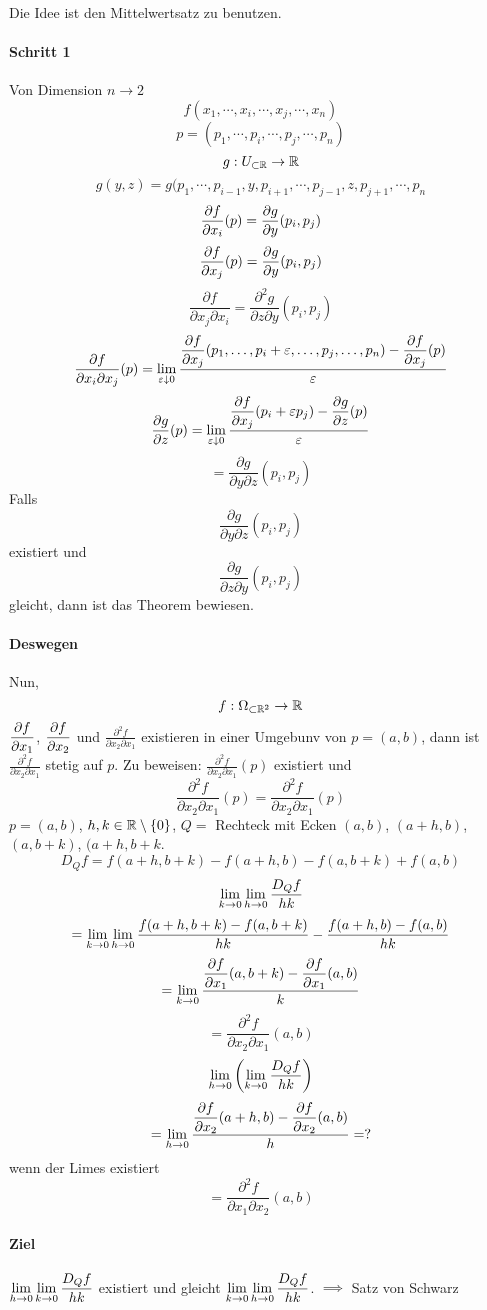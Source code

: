 \begin{Bew}
  Die Idee ist den Mittelwertsatz zu benutzen.
  \paragraph{Schritt 1} Von Dimension $n\to 2$
  \[f(x_1,\cdots,x_i,\cdots,x_j,\cdots,x_n)\]
  \[p=(p_1,\cdots,p_i,\cdots,p_j,\cdots,p_n)\]
  \[g:U_{\subset\mathbb{R}}\rightarrow\mathbb{R}\]
  \[g(y,z)=g(p_1,\cdots,p_{i-1},y,p_{i+1},\cdots,p_{j-1},z,p_{j+1},\cdots,p_n\]
  \[\dfrac{\partial f}{\partial x_i}(p)=\dfrac{\partial g}{\partial y}(p_i,p_j)\]
  \[\dfrac{\partial f}{\partial x_j}(p)=\dfrac{\partial g}{\partial y}(p_i,p_j)\]
  \[\frac{\partial f}{\partial x_j\partial x_i}=\frac{\partial^2 g}{\partial z\partial y}(p_i,p_j)\]
  \[\frac{\partial f}{\partial x_i\partial x_j}(p)=\lim_{\varepsilon\downarrow 0}\frac{\dfrac{\partial f}{\partial x_j}(p_1,\ldots,p_i+\varepsilon,\ldots,p_j,\ldots,p_n)-\dfrac{\partial f}{\partial x_j}(p)}{\varepsilon}\]
  \[\dfrac{\partial g}{\partial z}(p)=\lim_{\varepsilon\downarrow 0}\frac{\dfrac{\partial f}{\partial x_j}(p_i+\varepsilon p_j)-\dfrac{\partial g}{\partial z}(p)}{\varepsilon}\]
  \[=\frac{\partial g}{\partial y \partial z}(p_i,p_j)\]
  Falls
  \[\frac{\partial g}{\partial y \partial z}(p_i,p_j)\]
  existiert und
  \[\frac{\partial g}{\partial z \partial y}(p_i,p_j)\]
  gleicht, dann ist das Theorem bewiesen.
  \paragraph{Deswegen}
  Nun, 
  \[f:\Omega_{\subset\mathbb{R}^2}\rightarrow\mathbb{R}\]
  $\dfrac{\partial f}{\partial x_1}$, $\dfrac{\partial f}{\partial x_2}$ und $\frac{\partial^2 f}{\partial x_2\partial x_1}$ existieren in einer Umgebunv von $p=(a,b)$, dann ist $\frac{\partial^2 f}{\partial x_2\partial x_1}$ stetig auf $p$. Zu beweisen: $\frac{\partial^2 f}{\partial x_2\partial x_1}(p)$ existiert und
  \[\frac{\partial^2 f}{\partial x_2\partial x_1}(p)=\frac{\partial^2 f}{\partial x_2\partial x_1}(p)\]
  $p=(a,b)$, $h,k\in\mathbb{R}\setminus\left\{ 0 \right\}$, $Q=$ Rechteck mit Ecken $(a,b)$, $(a+h, b)$, $(a, b+k)$, $(a+h, b+k$.
  \[D_Qf=f(a+h,b+k)-f(a+h, b)-f(a,b+k)+f(a,b)\]
  \[\displaystyle\lim_{k\rightarrow0} \displaystyle\lim_{h\rightarrow0}\frac{D_Qf}{hk}\]
  \[=\displaystyle\lim_{k\rightarrow0} \displaystyle\lim_{h\rightarrow0}\frac{f(a+h,b+k)-f(a,b+k)}{hk}-\frac{f(a+h,b)-f(a,b)}{hk}\]
  \[=\displaystyle\lim_{k\rightarrow0}\frac{\dfrac{\partial f}{\partial x_1}(a,b+k)-\dfrac{\partial f}{\partial x_1}(a,b)}{k}\]
  \[=\frac{\partial^2f}{\partial x_2\partial x_1}(a,b)\]
  \[\displaystyle\lim_{h\rightarrow0}\left( \displaystyle\lim_{k\rightarrow0}\frac{D_Qf}{hk} \right)\]
  \[=\displaystyle\lim_{h\rightarrow0}\frac{\dfrac{\partial f}{\partial x_2}(a+h,b)-\dfrac{\partial f}{\partial x_2}(a,b)}{h}=?\]
  wenn der Limes existiert
  \[=\frac{\partial^2f}{\partial x_1\partial x_2}(a,b)\]
  \paragraph{Ziel}
  $\displaystyle\lim_{h\rightarrow0}\displaystyle\lim_{k\rightarrow0}\frac{D_Qf}{hk}$ existiert und gleicht $\displaystyle\lim_{k\rightarrow0}\displaystyle\lim_{h\rightarrow0}\frac{D_Qf}{hk}$. $\implies$ Satz von Schwarz

\end{Bew}
